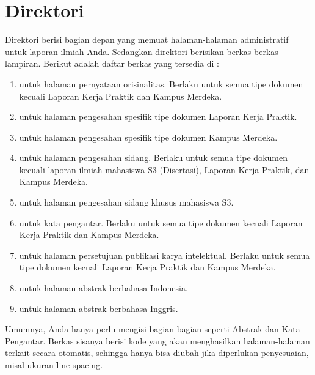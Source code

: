 \section{Direktori }
\label{sec:frontMatter-backMatter-tex}
Direktori  berisi bagian depan yang memuat halaman-halaman administratif untuk laporan ilmiah Anda.
Sedangkan direktori  berisikan berkas-berkas lampiran.
Berikut adalah daftar berkas yang tersedia di :
\begin{enumerate}
	\item {} untuk halaman pernyataan orisinalitas.
	Berlaku untuk semua tipe dokumen kecuali Laporan Kerja Praktik dan Kampus Merdeka.
	\item {} untuk halaman pengesahan spesifik tipe dokumen Laporan Kerja Praktik.
	\item {} untuk halaman pengesahan spesifik tipe dokumen Kampus Merdeka.
	\item {} untuk halaman pengesahan sidang.
	Berlaku untuk semua tipe dokumen kecuali laporan ilmiah mahasiswa S3 (Disertasi), Laporan Kerja Praktik, dan Kampus Merdeka.
	\item {} untuk halaman pengesahan sidang khusus mahasiswa S3.
	\item {} untuk kata pengantar.
	Berlaku untuk semua tipe dokumen kecuali Laporan Kerja Praktik dan Kampus Merdeka.
	\item {} untuk halaman persetujuan publikasi karya intelektual.
	Berlaku untuk semua tipe dokumen kecuali Laporan Kerja Praktik dan Kampus Merdeka.
	\item {} untuk halaman abstrak berbahasa Indonesia.
	\item {} untuk halaman abstrak berbahasa Inggris.
\end{enumerate}
Umumnya, Anda hanya perlu mengisi bagian-bagian seperti Abstrak dan Kata Pengantar.
Berkas sisanya berisi kode yang akan menghasilkan halaman-halaman terkait secara otomatis, sehingga hanya bisa diubah jika diperlukan penyesuaian, misal ukuran \f{line spacing}.


